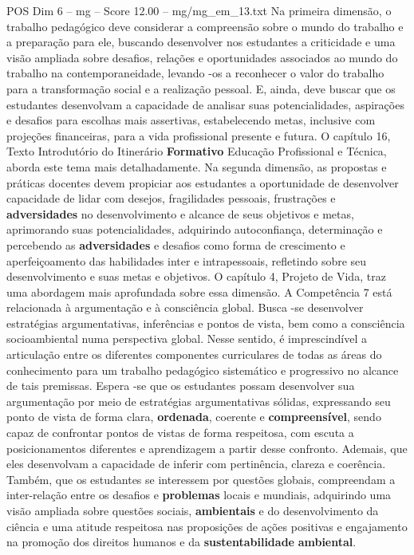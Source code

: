 \begin{textsample}{POS Dim 6 – mg – Score 12.00 – mg/mg\_em\_13.txt}
Na primeira dimensão, o trabalho pedagógico deve considerar a compreensão sobre o mundo do trabalho e a preparação para ele, buscando desenvolver nos estudantes a criticidade e uma visão ampliada sobre desafios, relações e oportunidades associados ao mundo do trabalho na contemporaneidade, levando -os a reconhecer o valor do trabalho para a transformação social e a realização pessoal.
E, ainda, deve buscar que os estudantes desenvolvam a capacidade de analisar suas potencialidades, aspirações e desafios para escolhas mais assertivas, estabelecendo metas, inclusive com projeções financeiras, para a vida profissional presente e futura.
O capítulo 16, Texto Introdutório do Itinerário \textbf{Formativo} Educação Profissional e Técnica, aborda este tema mais detalhadamente.
Na segunda dimensão, as propostas e práticas docentes devem propiciar aos estudantes a oportunidade de desenvolver capacidade de lidar com desejos, fragilidades pessoais, frustrações e \textbf{adversidades} no desenvolvimento e alcance de seus objetivos e metas, aprimorando suas potencialidades, adquirindo autoconfiança, determinação e percebendo as \textbf{adversidades} e desafios como forma de crescimento e aperfeiçoamento das habilidades inter e intrapessoais, refletindo sobre seu desenvolvimento e suas metas e objetivos.
O capítulo 4, Projeto de Vida, traz uma abordagem mais aprofundada sobre essa dimensão.
A Competência 7 está relacionada à argumentação e à consciência global.
Busca -se desenvolver estratégias argumentativas, inferências e pontos de vista, bem como a consciência socioambiental numa perspectiva global.
Nesse sentido, é imprescindível a articulação entre os diferentes componentes curriculares de todas as áreas do conhecimento para um trabalho pedagógico sistemático e progressivo no alcance de tais premissas.
Espera -se que os estudantes possam desenvolver sua argumentação por meio de estratégias argumentativas sólidas, expressando seu ponto de vista de forma clara, \textbf{ordenada}, coerente e \textbf{compreensível}, sendo capaz de confrontar pontos de vistas de forma respeitosa, com escuta a posicionamentos diferentes e aprendizagem a partir desse confronto.
Ademais, que eles desenvolvam a capacidade de inferir com pertinência, clareza e coerência.
Também, que os estudantes se interessem por questões globais, compreendam a inter-relação entre os desafios e \textbf{problemas} locais e mundiais, adquirindo uma visão ampliada sobre questões sociais, \textbf{ambientais} e do desenvolvimento da ciência e uma atitude respeitosa nas proposições de ações positivas e engajamento na promoção dos direitos humanos e da \textbf{sustentabilidade} \textbf{ambiental}.

\end{textsample}
